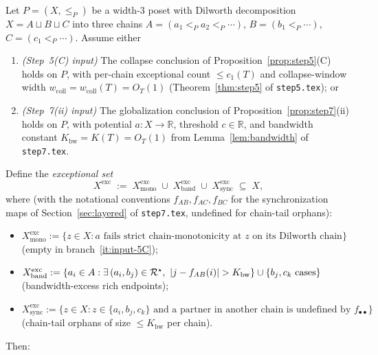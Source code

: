 \begin{lemma}
\label{lem:layered-from-step7}
Let $P = (X, \le_P)$ be a width-$3$ poset with Dilworth decomposition
$X = A \sqcup B \sqcup C$ into three chains
$A = (a_1 <_P a_2 <_P \cdots)$, $B = (b_1 <_P \cdots)$,
$C = (c_1 <_P \cdots)$.  Assume either
\begin{enumerate}[nosep, label=(\alph*)]
 \item\label{it:input-5C}
  \emph{(Step~5(C) input)} The collapse conclusion of
  Proposition~\ref{prop:step5}(C) holds on $P$, with per-chain
  exceptional count $\le c_1(T)$ and collapse-window width
  $w_{\mathrm{coll}} = w_{\mathrm{coll}}(T) = O_T(1)$
  (Theorem~\ref{thm:step5} of \texttt{step5.tex}); or
 \item\label{it:input-7ii}
  \emph{(Step~7(ii) input)} The globalization conclusion of
  Proposition~\ref{prop:step7}(ii) holds on $P$, with potential
  $a \colon X \to \mathbb{R}$, threshold $c \in \mathbb{R}$, and
  bandwidth constant $K_{\mathrm{bw}} = K(T) = O_T(1)$ from
  Lemma~\ref{lem:bandwidth} of \texttt{step7.tex}.
\end{enumerate}
Define the \emph{exceptional set}
\begin{equation}\label{eq:Xexc-def}
  X^{\mathrm{exc}}
  \;:=\;
  X^{\mathrm{exc}}_{\mathrm{mono}}
  \;\cup\; X^{\mathrm{exc}}_{\mathrm{band}}
  \;\cup\; X^{\mathrm{exc}}_{\mathrm{sync}}
  \;\subseteq\; X,
\end{equation}
where (with the notational conventions $f_{AB}, f_{AC}, f_{BC}$ for
the synchronization maps of Section~\ref{sec:layered} of
\texttt{step7.tex}, undefined for chain-tail orphans):
\begin{itemize}[nosep, leftmargin=*]
 \item $X^{\mathrm{exc}}_{\mathrm{mono}} := \{z \in X :
  a \text{ fails strict chain-monotonicity at } z \text{ on its
  Dilworth chain}\}$ (empty in branch~\ref{it:input-5C});
 \item $X^{\mathrm{exc}}_{\mathrm{band}} := \{a_i \in A :
  \exists\,(a_i, b_j)\in\mathcal{R}^\star,\ |j - f_{AB}(i)| > K_{\mathrm{bw}}\}
  \cup \{b_j, c_k \text{ cases}\}$
  (bandwidth-excess rich endpoints);
 \item $X^{\mathrm{exc}}_{\mathrm{sync}} := \{z \in X :
  z \in \{a_i, b_j, c_k\} \text{ and a partner in another chain is
  undefined by }f_{\bullet\bullet}\}$
  (chain-tail orphans of size $\le K_{\mathrm{bw}}$ per chain).
\end{itemize}
Then:
\begin{enumerate}[nosep, label=(\roman*)]

\end{enumerate}
\end{lemma}
